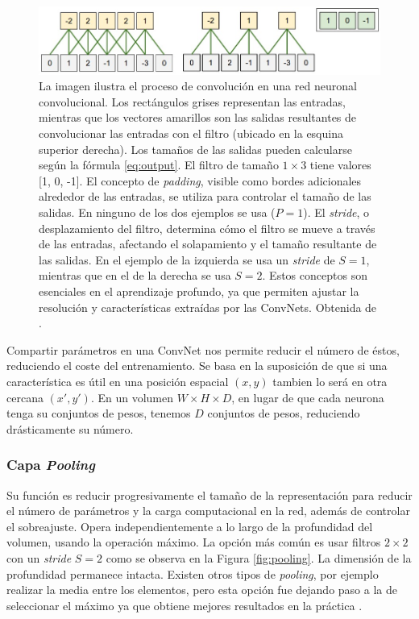\begin{figure}
    \centering
    \includegraphics[width=0.75\linewidth]{Plantilla_TFG_latex//imagenes//Inf//2.Fund/2.stride.jpeg}
    \caption[Proceso de convolución en una red neuronal convolucional]{La imagen ilustra el proceso de convolución en una red neuronal convolucional. Los rectángulos grises representan las entradas, mientras que los vectores amarillos son las salidas resultantes de convolucionar las entradas con el filtro (ubicado en la esquina superior derecha). Los tamaños de las salidas pueden calcularse según la fórmula \ref{eq:output}. El filtro de tamaño $1 \times 3$ tiene valores [1, 0, -1]. El concepto de \textit{padding}, visible como bordes adicionales alrededor de las entradas, se utiliza para controlar el tamaño de las salidas. En ninguno de los dos ejemplos se usa ($P=1$). El \textit{stride}, o desplazamiento del filtro, determina cómo el filtro se mueve a través de las entradas, afectando el solapamiento y el tamaño resultante de las salidas. En el ejemplo de la izquierda se usa un \textit{stride} de $S=1$, mientras que en el de la derecha se usa $S=2$. Estos conceptos son esenciales en el aprendizaje profundo, ya que permiten ajustar la resolución y características extraídas por las ConvNets. Obtenida de \cite{stanford_231}.}
    \label{fig:stride}
\end{figure}


Compartir parámetros en una ConvNet nos permite reducir el número de éstos, reduciendo el coste del entrenamiento. Se basa en la suposición de que si una característica es útil en una posición espacial $(x,y)$ tambien lo será en otra cercana $(x',y')$. En un volumen $W \times H \times D$, en lugar de que cada neurona tenga su conjuntos de pesos, tenemos $D$ conjuntos de pesos, reduciendo drásticamente su número. 

\subsubsection{Capa \textit{Pooling}}

Su función es reducir progresivamente el tamaño de la representación para reducir el número de parámetros y la carga computacional en la red, además de controlar el sobreajuste. Opera independientemente a lo largo de la profundidad del volumen, usando la operación máximo. La opción más común es usar filtros $2 \times 2$ con un \textit{stride} $S= 2$ como se observa en la Figura \ref{fig:pooling}. La dimensión de la profundidad permanece intacta. Existen otros tipos de \textit{pooling}, por ejemplo realizar la media entre los elementos, pero esta opción fue dejando paso a la de seleccionar el máximo ya que obtiene mejores resultados en la práctica \cite{stanford_231}.

